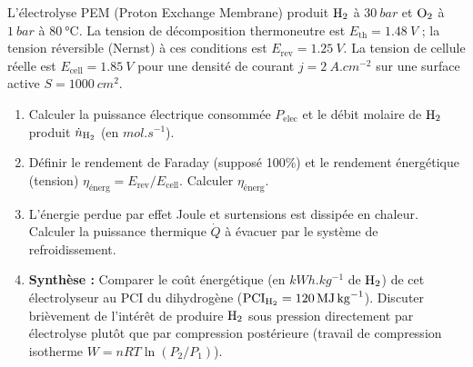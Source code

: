 \documentclass[11pt]{article}
\begin{document}
\begin{exercice}
L'électrolyse PEM (Proton Exchange Membrane) produit $\ce{H2}$ à $\SI{30}{bar}$ et $\ce{O2}$ à $\SI{1}{bar}$ à $\SI{80}{\celsius}$. La tension de décomposition thermoneutre est $E_{\text{th}} = \SI{1,48}{V}$ ; la tension réversible (Nernst) à ces conditions est $E_{\text{rev}} = \SI{1,25}{V}$. La tension de cellule réelle est $E_{\text{cell}} = \SI{1,85}{V}$ pour une densité de courant $j = \SI{2}{A.cm^{-2}}$ sur une surface active $S = \SI{1000}{cm^2}$.
\begin{enumerate}
    \item Calculer la puissance électrique consommée $P_{\text{elec}}$ et le débit molaire de $\ce{H2}$ produit $\dot{n}_{\ce{H2}}$ (en $\si{mol.s^{-1}}$).
    \item Définir le rendement de Faraday (supposé 100\%) et le rendement énergétique (tension) $\eta_{\text{énerg}} = E_{\text{rev}} / E_{\text{cell}}$. Calculer $\eta_{\text{énerg}}$.
    \item L'énergie perdue par effet Joule et surtensions est dissipée en chaleur. Calculer la puissance thermique $\dot{Q}$ à évacuer par le système de refroidissement.
    \item \textbf{Synthèse :} Comparer le coût énergétique (en $\si{kWh.kg^{-1}}$ de $\ce{H2}$) de cet électrolyseur au PCI du dihydrogène ($\text{PCI}_{\ce{H2}} = \SI{120}{MJ.kg^{-1}}$). Discuter brièvement de l'intérêt de produire $\ce{H2}$ sous pression directement par électrolyse plutôt que par compression postérieure (travail de compression isotherme $W = nRT \ln(P_2/P_1)$).
\end{enumerate}
\end{exercice}
\end{document}
